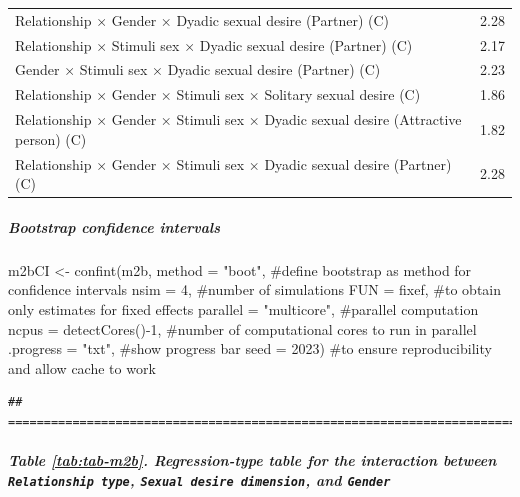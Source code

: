\documentclass[
  bookmarksnumbered]{article}
\newenvironment{Shaded}{\begin{snugshade}}{\end{snugshade}}
\newcommand{\AttributeTok}[1]{\textcolor[rgb]{0.80,0.80,0.80}{#1}}
\newcommand{\CommentTok}[1]{\textcolor[rgb]{0.50,0.62,0.50}{#1}}
\newcommand{\DecValTok}[1]{\textcolor[rgb]{0.86,0.86,0.80}{#1}}
\newcommand{\FunctionTok}[1]{\textcolor[rgb]{0.94,0.94,0.56}{#1}}
\newcommand{\NormalTok}[1]{\textcolor[rgb]{0.80,0.80,0.80}{#1}}
\newcommand{\OtherTok}[1]{\textcolor[rgb]{0.94,0.94,0.56}{#1}}
\newcommand{\SpecialCharTok}[1]{\textcolor[rgb]{0.86,0.64,0.64}{#1}}
\newcommand{\StringTok}[1]{\textcolor[rgb]{0.80,0.58,0.58}{#1}}
\begin{document}
\begin{table}[H]
\begin{tabular}[t]{lc}
Relationship × Gender × Dyadic sexual desire (Partner) (C) & 2.28\\
Relationship × Stimuli sex × Dyadic sexual desire (Partner) (C) & 2.17\\
Gender × Stimuli sex × Dyadic sexual desire (Partner) (C) & 2.23\\
Relationship × Gender × Stimuli sex × Solitary sexual desire (C) & 1.86\\
Relationship × Gender × Stimuli sex × Dyadic sexual desire (Attractive person) (C) & 1.82\\
Relationship × Gender × Stimuli sex × Dyadic sexual desire (Partner) (C) & 2.28\\
\bottomrule
\end{tabular}
\end{table}

\hypertarget{bootstrap-confidence-intervals-1}{%
\subparagraph{Bootstrap confidence intervals}\label{bootstrap-confidence-intervals-1}}

\begin{Shaded}
\begin{Highlighting}[]
\NormalTok{m2bCI }\OtherTok{\textless{}{-}} \FunctionTok{confint}\NormalTok{(m2b, }
                 \AttributeTok{method =} \StringTok{"boot"}\NormalTok{, }\CommentTok{\#define bootstrap as method for confidence intervals}
                 \AttributeTok{nsim =} \DecValTok{4}\NormalTok{, }\CommentTok{\#number of simulations}
                 \AttributeTok{FUN =}\NormalTok{ fixef, }\CommentTok{\#to obtain only estimates for fixed effects}
                 \AttributeTok{parallel =} \StringTok{"multicore"}\NormalTok{, }\CommentTok{\#parallel computation}
                 \AttributeTok{ncpus =} \FunctionTok{detectCores}\NormalTok{()}\SpecialCharTok{{-}}\DecValTok{1}\NormalTok{, }\CommentTok{\#number of computational cores to run in parallel}
                 \AttributeTok{.progress =} \StringTok{"txt"}\NormalTok{, }\CommentTok{\#show progress bar}
                 \AttributeTok{seed =} \DecValTok{2023}\NormalTok{) }\CommentTok{\#to ensure reproducibility and allow cache to work}
\end{Highlighting}
\end{Shaded}

\begin{verbatim}
## ================================================================================
\end{verbatim}

\hypertarget{table-reftabtab-m2b.-regression-type-table-for-the-interaction-between-relationship-type-sexual-desire-dimension-and-gender}{%
\subparagraph{\texorpdfstring{Table \ref{tab:tab-m2b}. Regression-type table for the interaction between \texttt{Relationship\ type}, \texttt{Sexual\ desire\ dimension}, and \texttt{Gender}}{Table \ref{tab:tab-m2b}. Regression-type table for the interaction between Relationship type, Sexual desire dimension, and Gender}}\label{table-reftabtab-m2b.-regression-type-table-for-the-interaction-between-relationship-type-sexual-desire-dimension-and-gender}}
\end{document}
